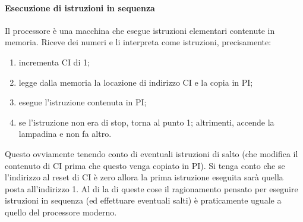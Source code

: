 \paragraph{Esecuzione di istruzioni in sequenza} Il processore è una macchina che esegue istruzioni elementari contenute in memoria. Riceve dei numeri e li interpreta come istruzioni, precisamente:
\begin{enumerate}
	\item incrementa CI di 1;
	\item legge dalla memoria la locazione di indirizzo CI e la copia in PI;
	\item esegue l'istruzione contenuta in PI;
	\item se l'istruzione non era di stop, torna al punto 1; altrimenti, accende la lampadina e non fa altro.
\end{enumerate}
Questo ovviamente tenendo conto di eventuali istruzioni di salto (che modifica il contenuto di CI prima che questo venga copiato in PI). Si tenga conto che se l'indirizzo al reset di CI è zero allora la prima istruzione eseguita sarà quella posta all'indirizzo 1. Al di la di queste cose il ragionamento pensato per eseguire istruzioni in sequenza (ed effettuare eventuali salti) è praticamente uguale a quello del processore moderno.

